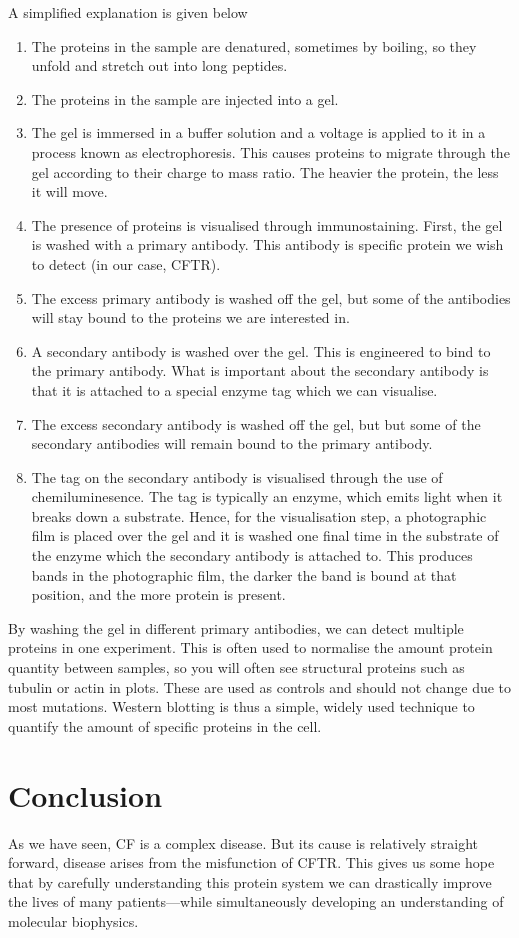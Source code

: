 A simplified explanation is given below
\begin{enumerate}
	\item The proteins in the sample are denatured, sometimes by boiling, so they unfold and stretch out into long peptides. 
	\item The proteins in the sample are injected into a gel.
	\item The gel is immersed in a buffer solution and a voltage is applied to it in a process known as electrophoresis. This causes proteins to migrate through the gel according to their charge to mass ratio. The heavier the protein, the less it will move. 
	\item The presence of proteins is visualised through immunostaining. First, the gel is washed with a primary antibody. This antibody is specific protein we wish to detect (in our case, CFTR). 
	\item The excess primary antibody is washed off the gel, but some of the antibodies will stay bound to the proteins we are interested in. 
	\item A secondary antibody is washed over the gel. This is engineered to bind to the primary antibody. What is important about the secondary antibody is that it is attached to a special enzyme tag which we can visualise.  
	\item The excess secondary antibody is washed off the gel, but but some of the secondary antibodies will remain bound to the primary antibody.
	\item The tag on the secondary antibody is visualised through the use of chemiluminesence. The tag is typically an enzyme, which emits light when it breaks down a substrate. Hence, for the visualisation step, a photographic film is placed over the gel and it is washed one final time in the substrate of the enzyme which the secondary antibody is attached to. This produces bands in the photographic film, the darker the band is bound at that position, and the more protein is present.
\end{enumerate}
By washing the gel in different  primary antibodies, we can detect multiple proteins in one experiment. This is often used to normalise the amount protein quantity between samples, so you will often see structural proteins such as tubulin or actin in plots. These are used as controls and should not change due to most mutations. Western blotting is thus a simple, widely used technique to quantify the amount of specific proteins in the cell. 

\section{Conclusion}
As we have seen, CF is a complex disease. But its cause is relatively straight forward, disease arises from the misfunction of CFTR. This gives us some hope that by carefully understanding this protein system we can drastically improve the lives of many patients---while simultaneously developing an understanding of molecular biophysics. 

